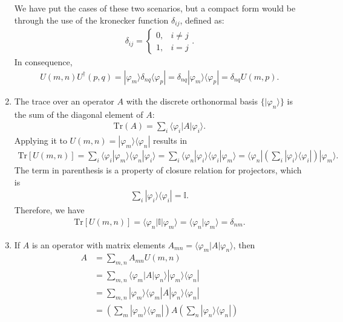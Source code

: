 \documentclass[letterpaper,11pt,twoside]{article}
\begin{document}
\begin{enumerate}[itemsep=0pt,topsep=0pt,label=\alph*.]
  We have put the cases of these two scenarios, but a compact form would be through the use of the kronecker function $\delta_{ij}$, defined as:
  \begin{align*}
    \delta_{ij}=\begin{cases}
      0,&i\neq j\\
      1,&i=j
    \end{cases}.
  \end{align*}
  In consequence,
  \begin{align*}
    U(m,n)U^\dagger (p,q)=|\varphi_m\rangle\delta_{nq}\langle\varphi_p|=\delta_{nq}|\varphi_m\rangle\langle\varphi_p|=\delta_{nq}U(m,p).
  \end{align*}
  \item The trace over an operator $A$ with the discrete orthonormal basis $\{|\varphi_n\rangle\}$ is the sum of 
  the diagonal element of $A$:
  \begin{align*}
    \text{Tr}(A)=\sum_i\langle \varphi_i|A|\varphi_i\rangle.
  \end{align*}
  Applying it to $U(m,n)=|\varphi_m\rangle\langle\varphi_n|$ results in
  \begin{align*}
    \text{Tr}[U(m,n)]=\sum_i\langle \varphi_i|\varphi_m\rangle\langle\varphi_n|\varphi_i\rangle=\sum_i\langle\varphi_n|\varphi_i\rangle\langle \varphi_i|\varphi_m\rangle=\langle\varphi_n|\left(\sum_i|\varphi_i\rangle\langle\varphi_i|\right)|\varphi_m\rangle.
  \end{align*}
  The term in parenthesis is a property of closure relation for projectors, which is 
  \begin{align*}
    \sum_i|\varphi_i\rangle\langle\varphi_i|=\mathbb{I}.
  \end{align*}
  Therefore, we have 
  \begin{align*}
    \text{Tr}[U(m,n)]=\langle\varphi_n|\mathbb{I}|\varphi_m\rangle=\langle\varphi_n|\varphi_m\rangle=\delta_{nm}.
  \end{align*}
  \item If $A$ is an operator with matrix elements $A_{mn}=\langle\varphi_m|A|\varphi_n\rangle$, then
  \begin{align*}
    A&=\sum_{m,n}A_{mn}U(m,n)\\
    &=\sum_{m,n}\langle\varphi_m|A|\varphi_n\rangle |\varphi_m\rangle\langle\varphi_n|\\
    &=\sum_{m,n}|\varphi_m\rangle\langle\varphi_m|A|\varphi_n\rangle\langle\varphi_n|\\
    &=\left(\sum_m|\varphi_m\rangle\langle\varphi_m|\right)A\left(\sum_n|\varphi_n\rangle\langle\varphi_n|\right)\\

\end{align*}
\end{enumerate}
\end{document}
